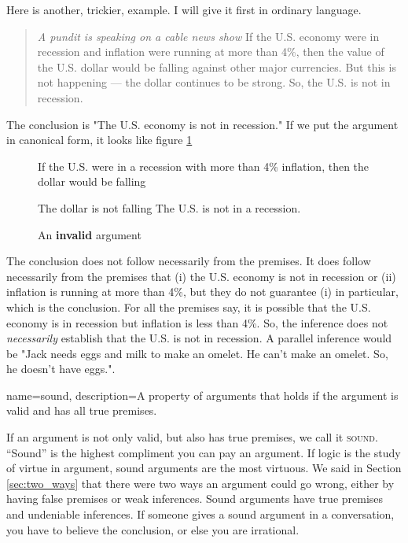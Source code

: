Here is another, trickier, example. I will give it first in ordinary language. 

\begin{quotation} \noindent\textit{A pundit is speaking on a cable news show} If the U.S. economy were in recession and inflation were running at more than 4\%, then the value of the U.S. dollar would be falling against other major currencies. But this is not happening --- the dollar continues to be strong. So, the U.S. is not in recession. \end{quotation}

The conclusion is "The U.S. economy is not in recession." If we put the argument in canonical form, it looks like figure \ref{fig:invalid_recession}

\begin{figure}
\begin{mdframed}[style=mytablebox]
\begin{earg*}
\item If the U.S. were in a recession with more than 4\% inflation, then the dollar would be falling
\item The dollar is not falling
\itemc[.3] The U.S. is not in a recession. 
\end{earg*}
\end{mdframed}
\caption{An \textbf{invalid} argument} \label{fig:invalid_recession}
\end{figure}

The conclusion does not follow necessarily from the premises. It does follow necessarily from the premises that (i) the U.S. economy is not in recession or (ii) inflation is running at more than 4\%, but they do not guarantee (i) in particular, which is the conclusion. For all the premises say, it is possible that the U.S. economy is in recession but inflation is less than 4\%. So, the inference does not \textit{necessarily} establish that the U.S. is not in recession. A parallel inference would be "Jack needs eggs and milk to make an omelet. He can't make an omelet. So, he doesn't have eggs.". 

{
name=sound,
description={A property of arguments that holds if the argument is valid and has all true premises.}
}

If an argument is not only valid, but also has true premises, we call it \textsc{\gls{sound}}. \label{def:sound} ``Sound'' is the highest compliment you can pay an argument. If logic is the study of virtue in argument, sound arguments are the most virtuous. We said in Section \ref{sec:two_ways} that there were two ways an argument could go wrong, either by having false premises or weak inferences. Sound arguments have true premises and undeniable inferences. If someone gives a sound argument in a conversation, you have to believe the conclusion, or else you are irrational.  

